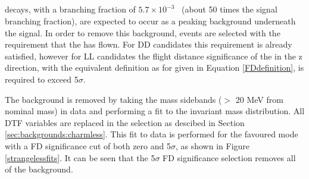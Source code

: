 \subsection{\decay{\B}{\D\pi\pi\pi}}
\label{sec:backgrounds:b2dpipipi}

\decay{\B}{\D\pi\pi\pi} decays, with a branching fraction of $5.7 \times 10^{-3}$~\cite{PDG2014} (about 50 times the signal branching fraction), are expected to occur as a peaking background underneath the signal. In order to remove this background, events are selected with the requirement that the \KS has flown. For DD candidates this requirement is already satisfied, however for LL candidates the flight distance significance of the \KS in the z direction, with the equivalent definition as for \Dz given in Equation \ref{FDdefinition}, is required to exceed 5$\sigma$. 

The \decay{\B}{\D\pi\pi\pi} background is removed by taking the \KS mass sidebands ($>$ 20 MeV from nominal \KS mass) in data and performing a fit to the invariant \B mass distribution. All DTF variables are replaced in the selection as descibed in Section \ref{sec:backgrounds:charmless}. This fit to data is performed for the favoured \decay{\Dz}{\Km\pip} mode with a FD significance cut of both zero and 5$\sigma$, as shown in Figure \ref{strangelessfits}. It can be seen that the 5$\sigma$ FD significance selection removes all of the \decay{\B}{\D\pi\pi\pi} background.

